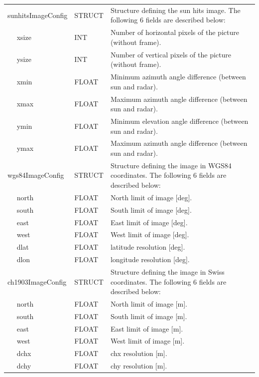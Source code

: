 \documentclass[a4paper,11pt,pdftex,twoside]{scrartcl}
\begin{document}
{{{\begin{longtable}{p{}p{}p{}}
sunhitsImageConfig     & STRUCT    & Structure defining the sun hits image. The following 6 fields are described below:\\
$\quad$ xsize      & INT      & Number of horizontal pixels of the picture (without frame).\\
$\quad$ ysize      & INT    & Number of vertical pixels of the picture (without frame).\\
$\quad$ xmin      & FLOAT  & Minimum azimuth angle difference (between sun and radar).\\
$\quad$ xmax     & FLOAT  & Maximum azimuth angle difference (between sun and radar).\\
$\quad$ ymin      & FLOAT  & Minimum elevation angle difference (between sun and radar).\\
$\quad$ ymax     & FLOAT  & Maximum azimuth angle difference (between sun and radar).\\

wgs84ImageConfig     & STRUCT    & Structure defining the image in WGS84 coordinates. The following 6 fields are described below:\\
$\quad$ north    & FLOAT     & North limit of image [deg].\\
$\quad$ south    & FLOAT    & South limit of image [deg].\\
$\quad$ east    & FLOAT      & East limit of image [deg].\\
$\quad$ west     & FLOAT      & West limit of image [deg].\\
$\quad$ dlat      & FLOAT      & latitude resolution [deg].\\
$\quad$ dlon     & FLOAT      & longitude resolution [deg].\\

ch1903ImageConfig     & STRUCT    & Structure defining the image in Swiss coordinates. The following 6 fields are described below:\\
$\quad$ north    & FLOAT     & North limit of image [m].\\
$\quad$ south    & FLOAT    & South limit of image [m].\\
$\quad$ east    & FLOAT      & East limit of image [m].\\
$\quad$ west     & FLOAT      & West limit of image [m].\\
$\quad$ dchx     & FLOAT      & chx resolution [m].\\
$\quad$ dchy     & FLOAT      & chy resolution [m].\\




\end{longtable}}}}
\end{document}
